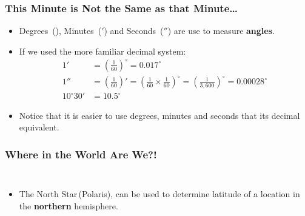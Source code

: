 \begin{frame}
\frametitle{This Minute is Not the Same as that Minute\ldots}
\medskip
{}

\begin{itemize}
\item Degrees~(\degree), Minutes~($'$) and Seconds~($''$) are use to measure \textbf{angles}.
\item If we used the more familiar decimal system:
%
{\small\begin{align*}
	1' &= \left(\frac{1}{60}\right)^\circ = 0.017^\circ\\
	1'' &= \left(\frac{1}{60}\right)'=\left(\frac{1}{60}\times\frac{1}{60}\right)^\circ = \left(\frac{1}{3,600}\right)^\circ = 0.00028^\circ\\
	10^\circ 30' &= 10.5^\circ
	\end{align*}}
%
\item Notice that it is easier to use degrees, minutes and seconds that its decimal equivalent.
\end{itemize}
\end{frame}

\begin{frame}
\frametitle{Where in the World Are We?!}
\medskip
\begin{columns}[b]
\begin{itemize}
\item The North Star\,(Polaris), can be used to determine latitude of a location in the \textbf{northern} hemisphere.
\end{itemize}


\end{columns}
\end{frame}

